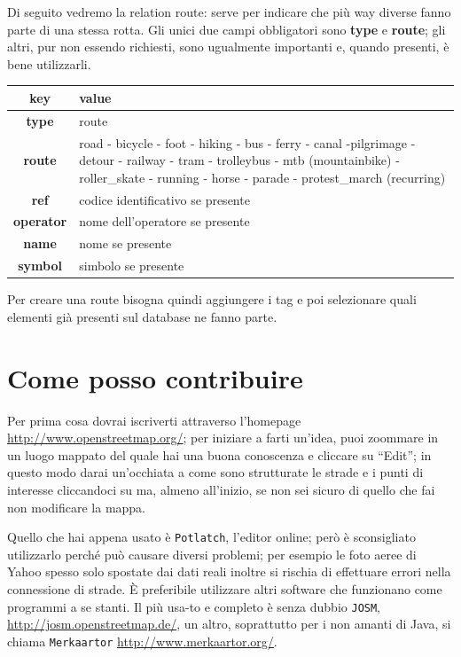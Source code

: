 \documentclass[a4paper,twoside,12pt,]{article}
\newcommand{\key}[1]{\textsf{\textbf{#1}}}
\newcommand{\val}[1]{\textsf{#1}}
\newcommand{\soft}[1]{\texttt{#1}}
\begin{document}
Di seguito vedremo la relation route: serve per indicare che più way diverse fanno parte di una stessa rotta. Gli unici due campi obbligatori sono \key{type} e \key{route}; gli altri, pur non essendo richiesti, sono ugualmente importanti e, quando presenti, è bene utilizzarli.
\begin{center}
 \begin{tabular}{cp{9cm}}
  \toprule
   \textbf{key} & \textbf{value} \\
  \midrule
   \key{type} & \val{route} \\
   \key{route} & \val{road} - \val{bicycle} - \val{foot} - \val{hiking} - \val{bus} - \val{ferry} - \val{canal} -\val{pilgrimage} - \val{detour} - \val{railway} - \val{tram} - \val{trolleybus} - \val{mtb (mountainbike)} - \val{roller\_skate} - \val{running} - \val{horse} - \val{parade} - \val{protest\_march (recurring)} \\
   \key{ref} & \val{codice identificativo se presente}\\
   \key{operator} & \val{nome dell'operatore se presente} \\
   \key{name} & \val{nome se presente} \\
   \key{symbol} & \val{simbolo se presente} \\
  \bottomrule
\end{tabular}
\end{center}
Per creare una route bisogna quindi aggiungere i tag e poi selezionare quali elementi già presenti sul database ne fanno parte.

\section{Come posso contribuire}
Per prima cosa dovrai iscriverti attraverso l'homepage \url{http://www.openstreetmap.org/}; per iniziare a farti un'idea, puoi zoommare in un luogo mappato del quale hai una buona conoscenza e cliccare su ``Edit''; in questo modo darai un'occhiata a come sono strutturate le strade e i punti di interesse cliccandoci su ma, almeno all'inizio, se non sei sicuro di quello che fai non modificare la mappa.

Quello che hai appena usato è \soft{Potlatch}, l'editor online; però è sconsigliato utilizzarlo perché può causare diversi problemi; per esempio le foto aeree di Yahoo spesso solo spostate dai dati reali inoltre si rischia di effettuare errori nella connessione di strade. È preferibile utilizzare altri software che funzionano come programmi a se stanti. Il più usa-to e completo è senza dubbio \soft{JOSM}, \url{http://josm.openstreetmap.de/}, un altro, soprattutto per i non amanti di Java, si chiama \soft{Merkaartor} \url{http://www.merkaartor.org/}.
\end{document}
